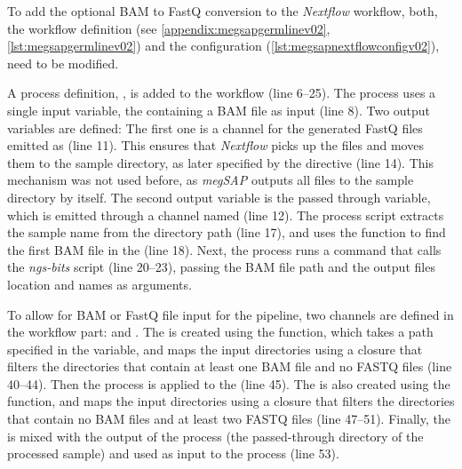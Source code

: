 To add the optional BAM to FastQ conversion to the \textit{Nextflow} workflow, both, the workflow definition (see \cref{appendix:megsapgermlinev02}, \cref{lst:megsapgermlinev02}) and the configuration (\cref{lst:megsapnextflowconfigv02}), need to be modified.

A process definition, , is added to the workflow (line \numrange{6}{25}). The process uses a single input variable, the  containing a BAM file as input (line \num{8}). Two output variables are defined: The first one is a  channel for the generated FastQ files emitted as  (line \num{11}). This ensures that \textit{Nextflow} picks up the files and moves them to the sample directory, as later specified by the  directive (line \num{14}). This mechanism was not used before, as \textit{\ac{megSAP}} outputs all files to the sample directory by itself. The second output variable is the passed through  variable, which is emitted through a channel named  (line \num{12}). The process script extracts the sample name from the directory path (line \num{17}), and uses the  function to find the first BAM file in the  (line \num{18}). Next, the process runs a command that calls the \textit{ngs-bits}  script (line \numrange{20}{23}), passing the BAM file path and the output files location and names as arguments.

To allow for BAM or FastQ file input for the pipeline, two channels are defined in the workflow part:  and . The  is created using the  function, which takes a path specified in the  variable, and maps the input directories using a closure that filters the directories that contain at least one BAM file and no FASTQ files (line \numrange{40}{44}). Then the  process is applied to the  (line \num{45}). The  is also created using the  function, and maps the input directories using a closure that filters the directories that contain no BAM files and at least two FASTQ files (line \numrange{47}{51}). Finally, the  is mixed with the  output of the  process (the passed-through directory of the processed sample) and used as input to the  process (line \num{53}).

